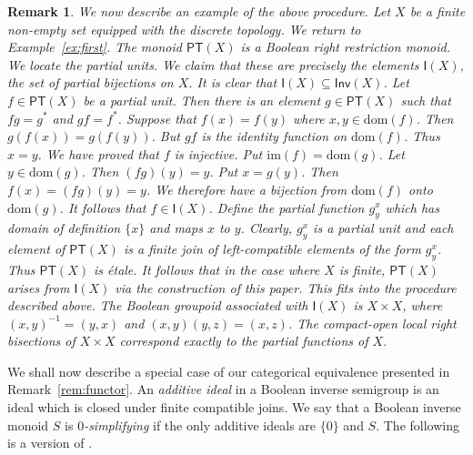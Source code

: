 \documentclass[a4paper]{amsart}
\newtheorem{remark}[theorem]{Remark}
\begin{document}
\begin{remark}
{We now describe an example of the above procedure.
Let $X$ be a finite non-empty set equipped with the discrete topology.
We return to Example~\ref{ex:first}.
The monoid
$\mathsf{PT}(X)$ is a Boolean right restriction monoid.
We locate the partial units.
We claim that these are precisely the elements $\mathsf{I}(X)$,
the set of partial bijections on $X$.
It is clear that $\mathsf{I}(X) \subseteq \mathsf{Inv}(X)$.
Let $f \in \mathsf{PT}(X)$ be a partial unit.
Then there is an element $g \in \mathsf{PT}(X)$
such that $fg = g^{\ast}$ and $gf = f^{\ast}$.
Suppose that $f(x) = f(y)$ where $x,y \in \mbox{dom}(f)$.
Then $g(f(x)) = g(f(y))$.
But $gf$ is the identity function on $\mbox{dom}(f)$.
Thus $x = y$.
We have proved that $f$ is injective.
Put $\mbox{im}(f) = \mbox{dom}(g)$.
Let $y \in \mbox{dom}(g)$.
Then $(fg)(y) = y$.
Put $x = g(y)$.
Then $f(x) = (fg)(y) = y$.
We therefore have a bijection from $\mbox{dom}(f)$ onto $\mbox{dom}(g)$.
It follows that $f \in \mathsf{I}(X)$.
Define the partial function $g^{x}_{y}$ which has domain of definition $\{x\}$ and maps $x$ to $y$.
Clearly,  $g^{x}_{y}$ is a partial unit
and each element of $\mathsf{PT}(X)$ is a finite join of left-compatible elements
of the form $g^{x}_{y}$.
Thus $\mathsf{PT}(X)$ is \'etale.
It follows that in the case where $X$ is finite,
$\mathsf{PT}(X)$ arises from $\mathsf{I}(X)$ via the construction of this paper.
This fits into the procedure described above.
The Boolean groupoid associated with $\mathsf{I}(X)$ is $X \times X$,
where $(x,y)^{-1} = (y,x)$ and $(x,y)(y,z) = (x,z)$.
The compact-open local right bisections of $X \times X$ correspond exactly  to the partial functions of $X$.}
\end{remark}

We shall now describe a special case of our categorical equivalence presented in Remark~\ref{rem:functor}.
An {\em additive ideal} in a Boolean inverse semigroup is an ideal which is closed under finite compatible joins.
We say that a Boolean inverse monoid $S$ is {\em $0$-simplifying}
if the only additive ideals are $\{0\}$ and $S$.
The following is a version of \cite[Theorem 4.7]{G2}.
\end{document}
